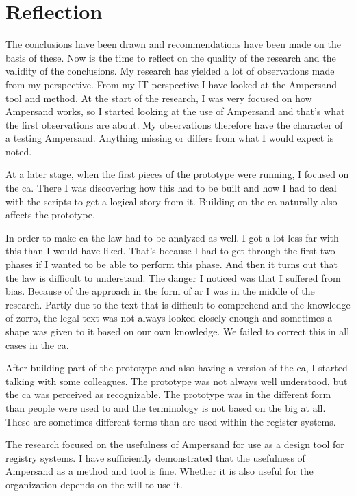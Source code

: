 \newpage
\section{Reflection} \label{reflection}

The conclusions have been drawn and recommendations have been made on the basis of these.
Now is the time to reflect on the quality of the research and the validity of the conclusions.
My research has yielded a lot of observations made from my perspective.
From my IT perspective I have looked at the Ampersand tool and method.
At the start of the research, I was very focused on how Ampersand works, so I started looking at the use of Ampersand and that's what the first observations are about.
My observations therefore have the character of a testing Ampersand.
Anything missing or differs from what I would expect is noted.

At a later stage, when the first pieces of the prototype were running, I focused on the \acrlong{ca}.
There I was discovering how this had to be built and how I had to deal with the scripts to get a logical story from it.
Building on the \acrlong{ca} naturally also affects the prototype.

In order to make \acrlong{ca} the law had to be analyzed as well.
I got a lot less far with this than I would have liked.
That's because I had to get through the first two phases if I wanted to be able to perform this phase.
And then it turns out that the law is difficult to understand.
The danger I noticed was that I suffered from bias.
Because of the approach in the form of \acrshort{ar} I was in the middle of the research.
Partly due to the text that is difficult to comprehend and the knowledge of \acrshort{zorro}, the legal text was not always looked closely enough and sometimes a shape was given to it based on our own knowledge.
We failed to correct this in all cases in the \acrlong{ca}.

After building part of the prototype and also having a version of the \acrlong{ca}, I started talking with some colleagues.
The prototype was not always well understood, but the \acrlong{ca} was perceived as recognizable.
The prototype was in the different form than people were used to and the terminology is not based on the \acrshort{big} at all.
These are sometimes different terms than are used within the register systems.

The research focused on the usefulness of Ampersand for use as a design tool for registry systems.
I have sufficiently demonstrated that the usefulness of Ampersand as a method and tool is fine.
Whether it is also useful for the organization depends on the will to use it.